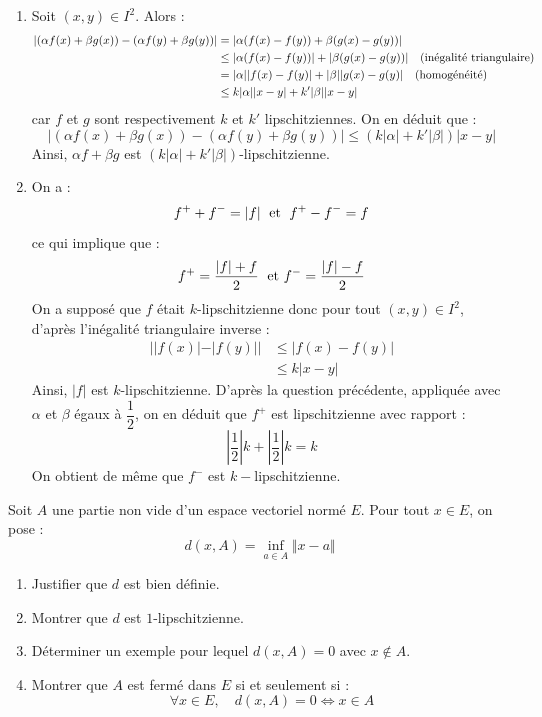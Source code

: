 \documentclass[a4paper,10pt]{report}
\begin{document}
\begin{enumerate}
\item Soit $(x,y) \in I^2$. Alors :
\begin{align*}
\vert (\alpha f(x)+ \beta g(x))-(\alpha f(y)+ \beta g(y)) \vert & = \vert \alpha (f(x)-f(y)) + \beta (g(x)-g(y)) \vert \\
& \leq \vert \alpha (f(x)-f(y)) \vert + \vert \beta (g(x)-g(y)) \vert \quad \hbox{(inégalité triangulaire)} \\
& = \vert \alpha \vert \vert f(x)-f(y) \vert + \vert \beta \vert \vert g(x)-g(y) \vert \quad \hbox{(homogénéité)} \\
& \leq k \vert \alpha \vert  \vert x-y \vert + k' \vert \beta \vert \vert x-y \vert 
\end{align*}
car $f$ et $g$ sont respectivement $k$ et $k'$ lipschitziennes. On en déduit que :
$$ \vert (\alpha f(x)+ \beta g(x))-(\alpha f(y)+ \beta g(y)) \vert \leq (k \vert \alpha \vert + k' \vert \beta \vert) \vert x-y \vert$$
Ainsi, $\alpha f+ \beta g$ est $(k \vert \alpha \vert + k' \vert \beta \vert)$-lipschitzienne.
\item On a :
$$ f^{+} + f^{-} = \vert f \vert \; \hbox{ et } \; f^{+}-f^{-} = f$$
ce qui implique que :
$$ f^{+} = \dfrac{\vert f \vert+f}{2} \; \hbox{ et } f^{-}=\dfrac{\vert f \vert - f}{2}$$
On a supposé que $f$ était $k$-lipschitzienne donc pour tout $(x,y) \in I^2$, d'après l'inégalité triangulaire \og inverse \fg :
\begin{align*}
\vert \vert f(x) \vert - \vert f(y) \vert \vert & \leq \vert f(x)-f(y) \vert  \\
& \leq k \vert x-y \vert
\end{align*}
Ainsi, $\vert f \vert$ est $k$-lipschitzienne. D'après la question précédente, appliquée avec $\alpha$ et $\beta$ égaux à $\dfrac{1}{2}$, on en déduit que $f^{+}$ est lipschitzienne avec rapport :
$$ \left\vert \dfrac{1}{2} \right\vert k + \left\vert \dfrac{1}{2} \right\vert k = k$$
On obtient de même que $f^{-}$ est $k-$lipschitzienne.
\end{enumerate}








\begin{Exercice}{} Soit $A$ une partie non vide d'un espace vectoriel normé $E$. Pour tout $x \in E$, on pose :
$$d(x,A) = \inf_{a \in A} \Vert x- a \Vert$$

\begin{enumerate}
\item Justifier que $d$ est bien définie.
\item Montrer que $d$ est $1$-lipschitzienne.
\item Déterminer un exemple pour lequel $d(x,A)=0$ avec $x \notin A$.
\item Montrer que $A$ est fermé dans $E$ si et seulement si :
$$ \forall x \in E, \quad d(x,A)=0 \Longleftrightarrow x \in A $$
\end{enumerate}
\end{Exercice}
\end{document}

